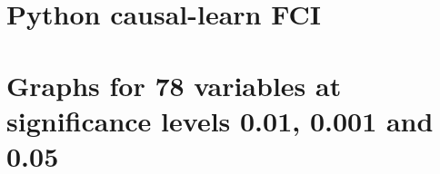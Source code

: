 \documentclass[main.tex]{subfiles}
\begin{document}
\section{Python causal-learn FCI }
\label{appendix: python_fci_clean}


\section{Graphs for 78 variables at significance levels 0.01, 0.001 and 0.05}
\label{appendix: 78_fci_pictures}
\begin{landscape}

\end{landscape}

\begin{landscape}

\end{landscape}

\begin{landscape}

\end{landscape}
\end{document}

